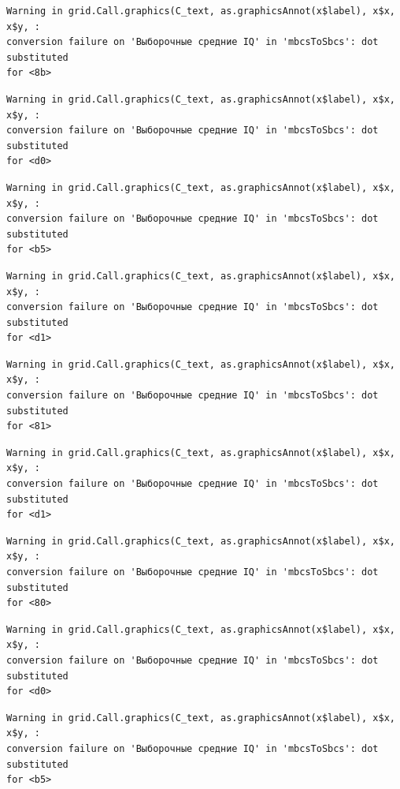 \documentclass[
  letterpaper,
  DIV=11,
  numbers=noendperiod]{scrreprt}
\theoremstyle{definition}
\theoremstyle{remark}
\begin{document}
\begin{verbatim}
Warning in grid.Call.graphics(C_text, as.graphicsAnnot(x$label), x$x, x$y, :
conversion failure on 'Выборочные средние IQ' in 'mbcsToSbcs': dot substituted
for <8b>
\end{verbatim}

\begin{verbatim}
Warning in grid.Call.graphics(C_text, as.graphicsAnnot(x$label), x$x, x$y, :
conversion failure on 'Выборочные средние IQ' in 'mbcsToSbcs': dot substituted
for <d0>
\end{verbatim}

\begin{verbatim}
Warning in grid.Call.graphics(C_text, as.graphicsAnnot(x$label), x$x, x$y, :
conversion failure on 'Выборочные средние IQ' in 'mbcsToSbcs': dot substituted
for <b5>
\end{verbatim}

\begin{verbatim}
Warning in grid.Call.graphics(C_text, as.graphicsAnnot(x$label), x$x, x$y, :
conversion failure on 'Выборочные средние IQ' in 'mbcsToSbcs': dot substituted
for <d1>
\end{verbatim}

\begin{verbatim}
Warning in grid.Call.graphics(C_text, as.graphicsAnnot(x$label), x$x, x$y, :
conversion failure on 'Выборочные средние IQ' in 'mbcsToSbcs': dot substituted
for <81>
\end{verbatim}

\begin{verbatim}
Warning in grid.Call.graphics(C_text, as.graphicsAnnot(x$label), x$x, x$y, :
conversion failure on 'Выборочные средние IQ' in 'mbcsToSbcs': dot substituted
for <d1>
\end{verbatim}

\begin{verbatim}
Warning in grid.Call.graphics(C_text, as.graphicsAnnot(x$label), x$x, x$y, :
conversion failure on 'Выборочные средние IQ' in 'mbcsToSbcs': dot substituted
for <80>
\end{verbatim}

\begin{verbatim}
Warning in grid.Call.graphics(C_text, as.graphicsAnnot(x$label), x$x, x$y, :
conversion failure on 'Выборочные средние IQ' in 'mbcsToSbcs': dot substituted
for <d0>
\end{verbatim}

\begin{verbatim}
Warning in grid.Call.graphics(C_text, as.graphicsAnnot(x$label), x$x, x$y, :
conversion failure on 'Выборочные средние IQ' in 'mbcsToSbcs': dot substituted
for <b5>
\end{verbatim}
\end{document}

